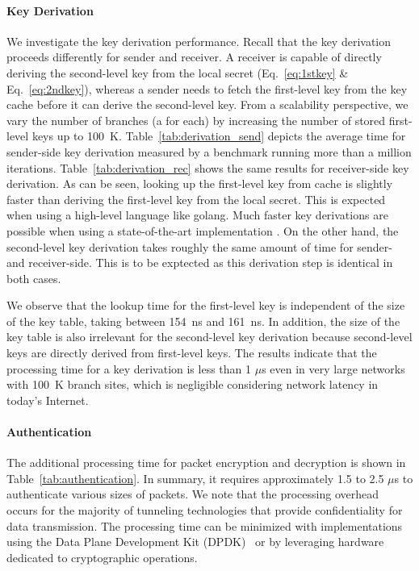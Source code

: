 \paragraph{Key Derivation}
We investigate the key derivation performance. Recall that the key derivation proceeds
differently for sender and receiver. A receiver is capable of directly deriving the
second-level key from the local secret (Eq.~\ref{eq:1stkey} \& Eq.~\ref{eq:2ndkey}),
whereas a sender needs to fetch the first-level key from the key cache before it can derive the second-level key.
From a scalability perspective, we vary the number of branches (a \tp for each) by increasing the number of stored
first-level keys up to \SI{100}{K}. Table~\ref{tab:derivation_send} depicts the average time for sender-side key derivation
measured by a benchmark running more than a million iterations. Table~\ref{tab:derivation_rec} shows the same results for
receiver-side key derivation. As can be seen, looking up the first-level key from cache is slightly faster than
deriving the first-level key from the local secret. This is expected when using a high-level language like golang.
Much faster key derivations are possible when using a state-of-the-art implementation \cite{rot2020piskes}.
On the other hand, the second-level key derivation takes roughly the same amount of time for sender- and receiver-side.
This is to be exptected as this derivation step is identical in both cases.

We observe that the lookup time for the first-level key is independent of the size of the key
table, taking between \SI{154}{ns} and \SI{161}{ns}. In addition, the size of the key table is
also irrelevant for the second-level key derivation
because second-level keys are directly derived from first-level keys.
The results indicate that the processing time for a key derivation is less than 1 $\mu$s
even in very large networks with \SI{100}{K} branch sites, which is negligible considering
network latency in today's Internet.


\paragraph{Authentication}
The additional processing time for packet encryption and decryption is shown in
Table~\ref{tab:authentication}. In summary, it requires approximately 1.5 to 2.5 $\mu$s to
authenticate various sizes of packets. We note that the processing overhead occurs for the majority
of tunneling technologies that provide confidentiality for data transmission. The processing
time can be minimized with implementations using the Data Plane Development Kit (DPDK)~\cite{dpdk} or by leveraging hardware dedicated to cryptographic operations.

